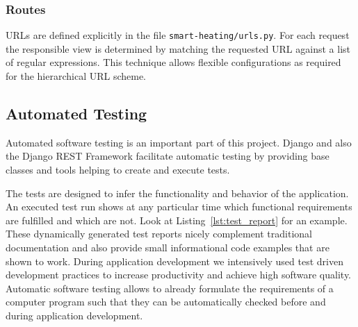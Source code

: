 \subsubsection{Routes}
\label{sec:server_infrastructure_routers}

URLs are defined explicitly in the file \texttt{smart-heating/urls.py}.
For each request the responsible view is determined by matching the requested URL against a list of regular expressions.
This technique allows flexible configurations as required for the hierarchical URL scheme.


\subsection{Automated Testing}

Automated software testing is an important part of this project. Django and also the Django REST Framework facilitate automatic testing by providing base classes and tools helping to create and execute tests.

The tests are designed to infer the functionality and behavior of the application.
An executed test run shows at any particular time which functional requirements are fulfilled and which are not.
Look at Listing~\ref{lst:test_report} for an example.
These dynamically generated test reports nicely complement traditional documentation and also provide small informational code examples that are shown to work.
During application development we intensively used test driven development practices to increase productivity and achieve high software quality.
Automatic software testing allows to already formulate the requirements of a computer program such that they can be automatically checked before and during application development.


